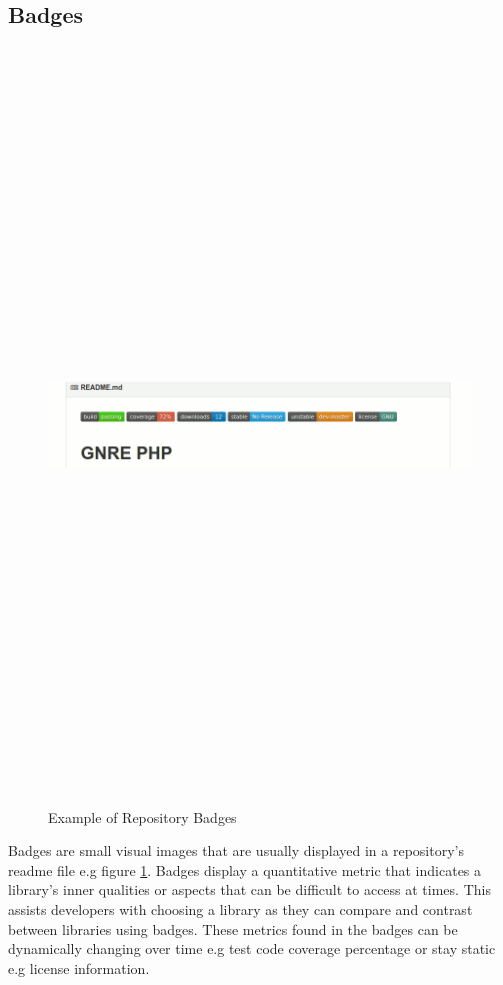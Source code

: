 \documentclass[12pt, letterpaper]{article}
\begin{document}
\subsection{Badges}
\begin{figure}[!htb]
    \centerline{
        \includegraphics[width=22cm,height=20cm,keepaspectratio=true]{gnrephpbadges}
    }
    \caption{
        Example of Repository Badges \cite{badgeimage}
    }
    \label{gnrephp}
\end{figure}
Badges are small visual images that are usually displayed in a repository's readme file e.g figure \ref{gnrephp}.
Badges display a quantitative metric that indicates a library's inner qualities or aspects that 
can be difficult to access at times. This assists developers with choosing a library
as they can compare and contrast between libraries using badges. These metrics found in the badges
can be dynamically changing over time e.g test code coverage percentage or stay static e.g license information.
\end{document}
